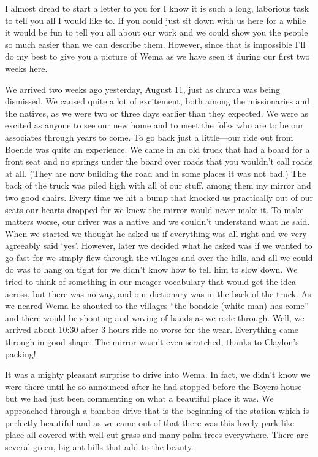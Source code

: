 \documentclass[
]{book}
\begin{document}
I almost dread to start a letter to you for I know it is such a long, laborious task to tell you all I would like to. If you could just sit down with us here for a while it would be fun to tell you all about our work and we could show you the people so much easier than we can describe them. However, since that is impossible I'll do my best to give you a picture of Wema as we have seen it during our first two weeks here.

We arrived two weeks ago yesterday, August 11, just as church was being dismissed. We caused quite a lot of excitement, both among the missionaries and the natives, as we were two or three days earlier than they expected. We were as excited as anyone to see our new home and to meet the folks who are to be our associates through years to come. To go back just a little---our ride out from Boende was quite an experience. We came in an old truck that had a board for a front seat and no springs under the board over roads that you wouldn't call roads at all. (They are now building the road and in some places it was not bad.) The back of the truck was piled high with all of our stuff, among them my mirror and two good chairs. Every time we hit a bump that knocked us practically out of our seats our hearts dropped for we knew the mirror would never make it. To make matters worse, our driver was a native and we couldn't understand what he said. When we started we thought he asked us if everything was all right and we very agreeably said `yes'. However, later we decided what he asked was if we wanted to go fast for we simply flew through the villages and over the hills, and all we could do was to hang on tight for we didn't know how to tell him to slow down. We tried to think of something in our meager vocabulary that would get the idea across, but there was no way, and our dictionary was in the back of the truck. As we neared Wema he shouted to the villages ``the bondele (white man) has come'' and there would be shouting and waving of hands as we rode through. Well, we arrived about 10:30 after 3 hours ride no worse for the wear. Everything came through in good shape. The mirror wasn't even scratched, thanks to Claylon's packing!

It was a mighty pleasant surprise to drive into Wema. In fact, we didn't know we were there until he so announced after he had stopped before the Boyers house but we had just been commenting on what a beautiful place it was. We approached through a bamboo drive that is the beginning of the station which is perfectly beautiful and as we came out of that there was this lovely park-like place all covered with well-cut grass and many palm trees everywhere. There are several green, big ant hills that add to the beauty.
\end{document}
